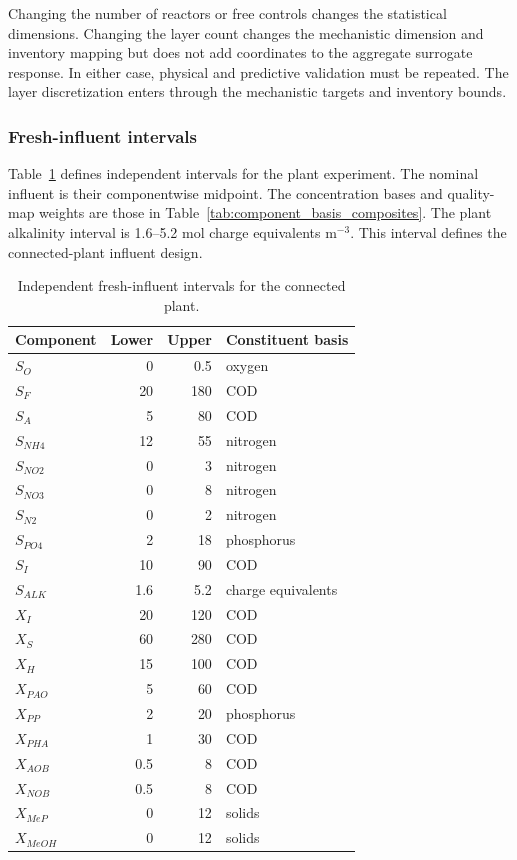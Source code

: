 Changing the number of reactors or free controls changes the statistical dimensions. Changing the layer count changes the mechanistic dimension and inventory mapping but does not add coordinates to the aggregate surrogate response. In either case, physical and predictive validation must be repeated. The layer discretization enters through the mechanistic targets and inventory bounds.

\subsubsection{Fresh-influent intervals}

Table~\ref{tab:plant_influent_intervals} defines independent intervals for the plant experiment. The nominal influent is their componentwise midpoint. The concentration bases and quality-map weights are those in Table~\ref{tab:component_basis_composites}. The plant alkalinity interval is 1.6--5.2 mol charge equivalents m$^{-3}$. This interval defines the connected-plant influent design.

\begin{table}[htbp]
\centering\small
\caption{Independent fresh-influent intervals for the connected plant.}\label{tab:plant_influent_intervals}
\begin{tabular}{lrrl}
\toprule
Component & Lower & Upper & Constituent basis\\
\midrule
$S_O$ & 0 & 0.5 & oxygen\\
$S_F$ & 20 & 180 & COD\\
$S_A$ & 5 & 80 & COD\\
$S_{NH4}$ & 12 & 55 & nitrogen\\
$S_{NO2}$ & 0 & 3 & nitrogen\\
$S_{NO3}$ & 0 & 8 & nitrogen\\
$S_{N2}$ & 0 & 2 & nitrogen\\
$S_{PO4}$ & 2 & 18 & phosphorus\\
$S_I$ & 10 & 90 & COD\\
$S_{ALK}$ & 1.6 & 5.2 & charge equivalents\\
$X_I$ & 20 & 120 & COD\\
$X_S$ & 60 & 280 & COD\\
$X_H$ & 15 & 100 & COD\\
$X_{PAO}$ & 5 & 60 & COD\\
$X_{PP}$ & 2 & 20 & phosphorus\\
$X_{PHA}$ & 1 & 30 & COD\\
$X_{AOB}$ & 0.5 & 8 & COD\\
$X_{NOB}$ & 0.5 & 8 & COD\\
$X_{MeP}$ & 0 & 12 & solids\\
$X_{MeOH}$ & 0 & 12 & solids\\
\bottomrule
\end{tabular}
\end{table}

